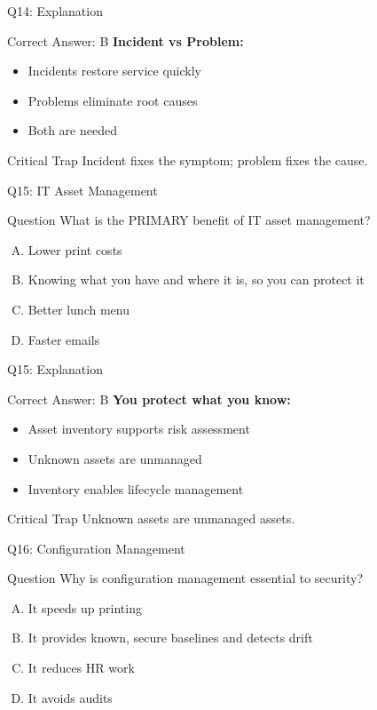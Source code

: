 \documentclass{beamer}
\begin{document}
	\begin{frame}{Q14: Explanation}
		\begin{block}{Correct Answer: B}
			\textbf{Incident vs Problem:}
			\begin{itemize}
				\item Incidents restore service quickly
				\item Problems eliminate root causes
				\item Both are needed
			\end{itemize}
		\end{block}
		\begin{alertblock}{Critical Trap}
			Incident fixes the symptom; problem fixes the cause.
		\end{alertblock}
	\end{frame}
	
	\begin{frame}{Q15: IT Asset Management}
		\begin{block}{Question}
			What is the PRIMARY benefit of IT asset management?
		\end{block}
		\begin{enumerate}[(A)]
			\item Lower print costs
			\item Knowing what you have and where it is, so you can protect it
			\item Better lunch menu
			\item Faster emails
		\end{enumerate}
	\end{frame}
	
	\begin{frame}{Q15: Explanation}
		\begin{block}{Correct Answer: B}
			\textbf{You protect what you know:}
			\begin{itemize}
				\item Asset inventory supports risk assessment
				\item Unknown assets are unmanaged
				\item Inventory enables lifecycle management
			\end{itemize}
		\end{block}
		\begin{alertblock}{Critical Trap}
			Unknown assets are unmanaged assets.
		\end{alertblock}
	\end{frame}
	
	\begin{frame}{Q16: Configuration Management}
		\begin{block}{Question}
			Why is configuration management essential to security?
		\end{block}
		\begin{enumerate}[(A)]
			\item It speeds up printing
			\item It provides known, secure baselines and detects drift
			\item It reduces HR work
			\item It avoids audits
		\end{enumerate}
	\end{frame}
	
\end{document}
